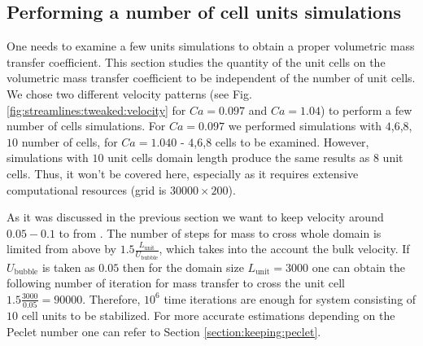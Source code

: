 \documentclass{article}
\newcommand{\lunit}{L_{\mathrm{unit}}}
\newcommand{\ububble}{U_{\mathrm{bubble}}}
\begin{document}

\subsection{Performing a number of cell units simulations}
One needs to examine a few units simulations to obtain a proper volumetric
mass transfer coefficient. This section studies the quantity of the unit cells on the volumetric
mass transfer coefficient to be independent of the number of unit cells. We chose two different
velocity patterns (see Fig. \ref{fig:streamlines:tweaked:velocity} for $Ca=0.097$ and $Ca=1.04$) to
perform a few number of cells simulations. For $Ca=0.097$ we performed simulations with
$4$,$6$,$8$,$10$ number of cells, for $Ca=1.040$ - $4$,$6$,$8$ cells to be examined. However,
simulations with $10$ unit cells domain length produce the same results as $8$ unit cells.
Thus, it won't be covered here, especially as it requires extensive computational resources (grid is
$30000\times 200$). 

As it was discussed in the previous section we want to keep
velocity around $0.05-0.1$ to from . The number of steps for mass to cross whole domain is
limited from above by $1.5 \frac{\lunit}{\ububble}$, which takes into the account the bulk
velocity. If $\ububble$ is taken as $0.05$ then for
the domain size $\lunit=3000$ one can obtain the following number of iteration for mass transfer to
cross the unit cell $1.5 \frac{3000}{0.05}=90000$. Therefore, $10^{6}$ time iterations are enough
for system consisting of $10$ cell units to be stabilized. For more accurate estimations depending
on the Peclet number one can refer to Section \ref{section:keeping:peclet}.
\end{document}
